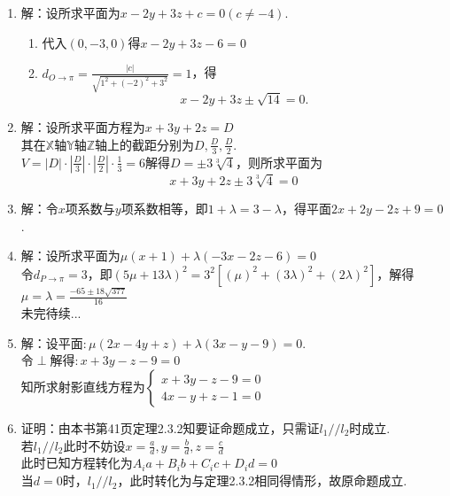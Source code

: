 \documentclass[UTF8]{ctexart}
\begin{document}
\begin{enumerate}
\item 解：设所求平面为$x-2y+3z+c=0\left(c\neq-4\right).$\\
\begin{enumerate}[(1)]
\item 代入$\left(0,-3,0\right)$得$x-2y+3z-6=0$
\item $d_{O\to\pi}=\displaystyle\frac{\left|c\right|}{\sqrt{1^2+\left(-2\right)^2+3^2}}=1$，得$$x-2y+3z\pm\sqrt{14}=0.$$
\end{enumerate}

\item 解：设所求平面方程为$x+3y+2z=D$\\
其在$\mathbb{X}$轴$\mathbb{Y}$轴$\mathbb{Z}$轴上的截距分别为$D,\displaystyle\frac{D}{3},\displaystyle\frac{D}{2}.$\\
$V=\left|D\right|\cdot\left|\displaystyle\frac{D}{3}\right|\cdot\left|\displaystyle\frac{D}{2}\right|\cdot\displaystyle\frac{1}{3}=6$解得$D=\pm3\sqrt[3]{4}$，则所求平面为$$x+3y+2z\pm3\sqrt[3]{4}=0$$

\item 解：令$x$项系数与$y$项系数相等，即$1+\lambda=3-\lambda$，得平面$2x+2y-2z+9=0$.

\item 解：设所求平面为$\mu\left(x+1\right)+\lambda\left(-3x-2z-6\right)=0$\\令$d_{P\to\pi}=3$，即$\left(5\mu+13\lambda\right)^2=3^2\left[\left(\mu\right)^2+\left(3\lambda\right)^2+\left(2\lambda\right)^2\right]$，解得$\mu=\lambda=\displaystyle\frac{-65\pm18\sqrt{377}}{16}$\\
未完待续...

\item 解：设平面\uppercase\expandafter{}$:\mu\left(2x-4y+z\right)+\lambda\left(3x-y-9\right)=0$.\\
令\uppercase\expandafter{}$\perp$\uppercase\expandafter{}解得\uppercase\expandafter{}$:x+3y-z-9=0$\\
知所求射影直线方程为$\left\{\begin{array}{l}x+3y-z-9=0\\4x-y+z-1=0\end{array}\right.$

\item 证明：由本书第41页定理2.3.2知要证命题成立，只需证$l_1//l_2$时成立.\\
若$l_1//l_2$此时不妨设$x=\displaystyle\frac{a}{d},y=\displaystyle\frac{b}{d},z=\displaystyle\frac{c}{d}$\\
此时已知方程转化为$A_{i}a+B_{i}b+C_{i}c+D_{i}d=0$\\
当$d=0$时，$l_1//l_2$，此时转化为与定理2.3.2相同得情形，故原命题成立. 
\end{enumerate}
\end{document}
